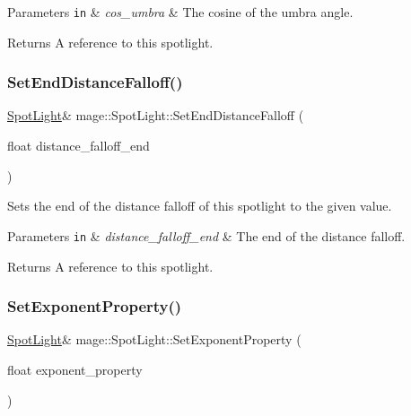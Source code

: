 \begin{DoxyParams}[1]{Parameters}
\mbox{\tt in}  & {\em cos\+\_\+umbra} & The cosine of the umbra angle. \\
\hline
\end{DoxyParams}
\begin{DoxyReturn}{Returns}
A reference to this spotlight. 
\end{DoxyReturn}
\hypertarget{classmage_1_1_spot_light_ab3bc85b2093e6ae8b5a1bec825b97f1c}{}\label{classmage_1_1_spot_light_ab3bc85b2093e6ae8b5a1bec825b97f1c} 
\subsubsection{\texorpdfstring{Set\+End\+Distance\+Falloff()}{SetEndDistanceFalloff()}}
{\footnotesize\ttfamily \hyperlink{classmage_1_1_spot_light}{Spot\+Light}\& mage\+::\+Spot\+Light\+::\+Set\+End\+Distance\+Falloff (\begin{DoxyParamCaption}\item[{float}]{distance\+\_\+falloff\+\_\+end }\end{DoxyParamCaption})\hspace{0.3cm}{\ttfamily [noexcept]}}

Sets the end of the distance falloff of this spotlight to the given value.


\begin{DoxyParams}[1]{Parameters}
\mbox{\tt in}  & {\em distance\+\_\+falloff\+\_\+end} & The end of the distance falloff. \\
\hline
\end{DoxyParams}
\begin{DoxyReturn}{Returns}
A reference to this spotlight. 
\end{DoxyReturn}
\hypertarget{classmage_1_1_spot_light_abdde33958e6d2ce38c41f7624c3ab265}{}\label{classmage_1_1_spot_light_abdde33958e6d2ce38c41f7624c3ab265} 
\subsubsection{\texorpdfstring{Set\+Exponent\+Property()}{SetExponentProperty()}}
{\footnotesize\ttfamily \hyperlink{classmage_1_1_spot_light}{Spot\+Light}\& mage\+::\+Spot\+Light\+::\+Set\+Exponent\+Property (\begin{DoxyParamCaption}\item[{float}]{exponent\+\_\+property }\end{DoxyParamCaption})\hspace{0.3cm}{\ttfamily [noexcept]}}


